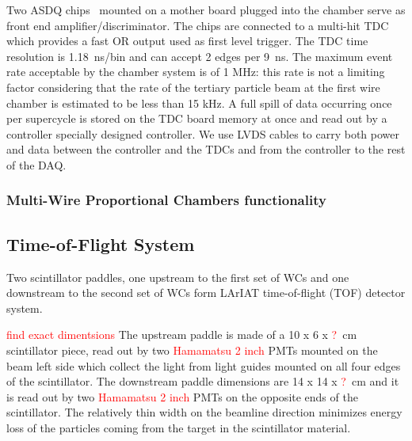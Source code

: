 Two ASDQ chips~\cite{ASDQchip} mounted on a mother board plugged into the chamber serve as front end amplifier/discriminator. The chips are connected to a multi-hit TDC~\cite{Sten} which provides a fast OR output used as first level trigger. The TDC time resolution is 1.18~ns/bin and can accept 2 edges per 9~ns.  
The maximum event rate acceptable by the chamber system is of 1 MHz: this rate is not a limiting factor considering that the rate of the tertiary particle beam at the first wire chamber is estimated to be less than 15 kHz. A full spill of data occurring once per supercycle is stored on the TDC board memory at once and read out by a controller specially designed controller.  We use LVDS cables to carry both power and data between the controller and the TDCs and from the controller to the rest of the DAQ.  

\subsubsection{Multi-Wire Proportional Chambers functionality}\label{sec:MWPCfunc}


\subsection{Time-of-Flight System}\label{sec:TOF}
Two scintillator paddles, one upstream to the first set of WCs and one downstream to the second set of WCs  form LArIAT  time-of-flight (TOF) detector system. 

 \textcolor{red}{find exact dimentsions}
The upstream paddle is made of a 10 x 6 x \textcolor{red}{?}~cm scintillator piece, read out by two \textcolor{red}{Hamamatsu 2 inch} PMTs mounted on the beam left side which collect the light from light guides mounted on all four edges of the scintillator. The downstream paddle dimensions are  14 x 14 x \textcolor{red}{?}~cm and it is read out by two \textcolor{red}{Hamamatsu 2 inch} PMTs on the opposite ends of the scintillator.
The relatively thin width on the beamline direction minimizes energy loss of the particles coming from the target in the scintillator material.




